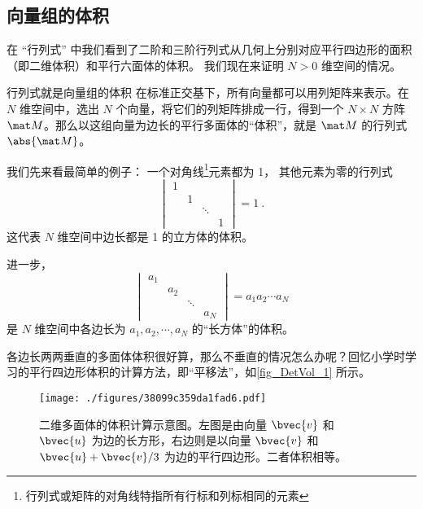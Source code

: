 

\subsection{向量组的体积}

在 “行列式” 中我们看到了二阶和三阶行列式从几何上分别对应平行四边形的面积（即二维体积）和平行六面体的体积。 我们现在来证明 $N > 0$ 维空间的情况。

\begin{theorem}{行列式就是向量组的体积}
在标准正交基下，所有向量都可以用列矩阵来表示。在 $N$ 维空间中，选出 $N$ 个向量，将它们的列矩阵排成一行，得到一个 $N\times N$ 方阵 $\mat M$。那么以这组向量为边长的平行多面体的“体积”，就是 $\mat M$ 的行列式 $\abs{\mat M}$。
\end{theorem}


我们先来看最简单的例子： 一个对角线\footnote{行列式或矩阵的对角线特指所有行标和列标相同的元素}元素都为 1， 其他元素为零的行列式
\begin{equation}
\begin{vmatrix}
1 & & &\\
  & 1 & &\\
  &  & \ddots &\\
  & & & 1
\end{vmatrix} = 1~.
\end{equation}
这代表 $N$ 维空间中边长都是 1 的立方体的体积。

进一步，
\begin{equation}
\begin{vmatrix}
a_1 & & &\\
  & a_2 & &\\
  &  & \ddots &\\
  & & & a_N
\end{vmatrix} = a_1a_2\cdots a_N
\end{equation}
是 $N$ 维空间中各边长为 $a_1, a_2, \cdots, a_N$ 的“长方体”的体积。

各边长两两垂直的多面体体积很好算，那么不垂直的情况怎么办呢？回忆小学时学习的平行四边形体积的计算方法，即“平移法”，如\autoref{fig_DetVol_1} 所示。
\begin{figure}[ht]
\centering
\texttt{[image: ./figures/38099c359da1fad6.pdf]}
\caption{二维多面体的体积计算示意图。左图是由向量 $\bvec{v}$ 和 $\bvec{u}$ 为边的长方形，右边则是以向量 $\bvec{v}$ 和 $\bvec{u}+\bvec{v}/3$ 为边的平行四边形。二者体积相等。} \label{fig_DetVol_1}
\end{figure}

